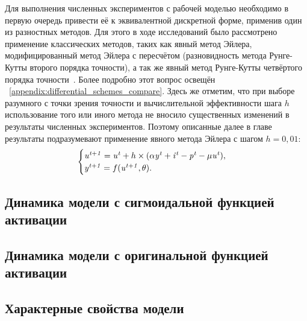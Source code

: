 Для выполнения численных экспериментов с рабочей моделью необходимо в первую очередь привести её к эквивалентной дискретной форме, применив один из разностных методов. Для этого в ходе исследований было рассмотрено применение классических методов, таких как явный метод Эйлера, модифицированный метод Эйлера с пересчётом (разновидность метода Рунге-Кутты второго порядка точности), а так же явный метод Рунге-Кутты четвёртого порядка точности~\cite{Hairer1990}. Более подробно этот вопрос освещён \inappendix~\ref{appendix:differential_schemes_compare}. Здесь же отметим, что при выборе разумного с точки зрения точности и вычислительной эффективности шага $h$ использование того или иного метода не вносило существенных изменений в результаты численных экспериментов. Поэтому описанные далее в главе результаты подразумевают применение явного метода Эйлера с шагом $h = 0,01$:
\begin{equation*}
    \begin{cases}
        \mathit{u^{t+1}} = \mathit{u^{t}} + h \times ( \alpha\mathit{y^{t}} + \mathit{i^{t}} - \mathit{p^{t}} - \mu\mathit{u^{t}} ), \\ 
        \mathit{y^{t+1}} = f(\mathit{u^{t+1}}, \theta).
    \end{cases}
\end{equation*}


\subsection{Динамика модели с сигмоидальной функцией активации}

\subsection{Динамика модели с оригинальной функцией активации}

\subsection{Характерные свойства модели}


